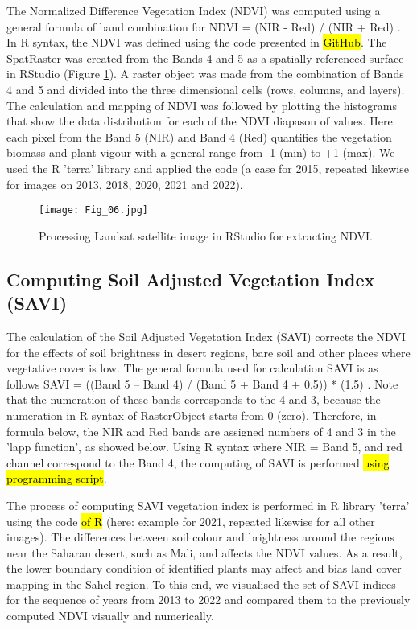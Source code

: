 \documentclass[12pt,a4paper,oneside]{article}
\def \newpar{\vspace{6pt}}
\begin{document}
\newpar The Normalized Difference Vegetation Index (NDVI) was computed using a general formula of band combination for NDVI = (NIR - Red) / (NIR + Red) \citep{Tarpley}. In R syntax, the NDVI was defined using the code presented in \hl{GitHub}. The SpatRaster was created from the Bands 4 and 5 as a spatially referenced surface in RStudio (Figure \ref{fig06}). A raster object was made from the combination of Bands 4 and 5 and divided into the three dimensional cells (rows, columns, and layers). The calculation and mapping of NDVI was followed by plotting the histograms that show the data distribution for each of the NDVI diapason of values. Here each pixel from the Band 5 (NIR) and Band 4 (Red) quantifies the vegetation biomass and plant vigour with a general range from -1 (min) to +1 (max). We used the R 'terra' library and applied the code\hl{ }(a case for 2015, repeated likewise for images on 2013, 2018, 2020, 2021 and 2022).

\begin{figure}[H]
\centering
	\texttt{[image: Fig\_06.jpg]}
		\vspace*{20pt}\caption{Processing Landsat satellite image in RStudio for extracting NDVI.
	\label{fig06}}
\end{figure}

\subsection*{Computing Soil Adjusted Vegetation Index (SAVI)}

\newpar The calculation of the Soil Adjusted Vegetation Index (SAVI) \citep{HUETE1988295} corrects the NDVI for the effects of soil brightness in desert regions, bare soil and other places where vegetative cover is low. The general formula used for calculation SAVI is as follows SAVI = ((Band 5 – Band 4) / (Band 5 + Band 4 + 0.5)) * (1.5) \citep{HUETE1988295,Huete}. Note that the numeration of these bands corresponds to the 4 and 3, because the numeration in R syntax of RasterObject starts from 0 (zero). Therefore, in formula below, the NIR and Red bands are assigned numbers of 4 and 3 in the 'lapp function', as showed below. Using R syntax where NIR = Band 5, and red channel correspond to the Band 4, the computing of SAVI is performed \hl{using programming script}.

\newpar The process of computing SAVI vegetation index is performed in R library 'terra' using the code \hl{of R} (here: example for 2021, repeated likewise for all other images). The differences between soil colour and brightness around the regions near the Saharan desert, such as Mali, and affects the NDVI values. As a result, the lower boundary condition of identified plants may affect and bias land cover mapping in the Sahel region. To this end, we visualised the set of SAVI indices for the sequence of years from 2013 to 2022 and compared them to the previously computed NDVI visually and numerically.
\end{document}
